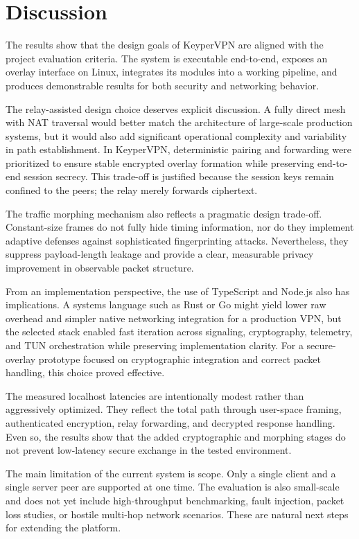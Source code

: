 \documentclass[conference]{IEEEtran}
\begin{document}
\section{Discussion}
The results show that the design goals of KeyperVPN are aligned with the project evaluation criteria. The system is executable end-to-end, exposes an overlay interface on Linux, integrates its modules into a working pipeline, and produces demonstrable results for both security and networking behavior.

The relay-assisted design choice deserves explicit discussion. A fully direct mesh with NAT traversal would better match the architecture of large-scale production systems, but it would also add significant operational complexity and variability in path establishment. In KeyperVPN, deterministic pairing and forwarding were prioritized to ensure stable encrypted overlay formation while preserving end-to-end session secrecy. This trade-off is justified because the session keys remain confined to the peers; the relay merely forwards ciphertext.

The traffic morphing mechanism also reflects a pragmatic design trade-off. Constant-size frames do not fully hide timing information, nor do they implement adaptive defenses against sophisticated fingerprinting attacks. Nevertheless, they suppress payload-length leakage and provide a clear, measurable privacy improvement in observable packet structure.

From an implementation perspective, the use of TypeScript and Node.js also has implications. A systems language such as Rust or Go might yield lower raw overhead and simpler native networking integration for a production VPN, but the selected stack enabled fast iteration across signaling, cryptography, telemetry, and TUN orchestration while preserving implementation clarity. For a secure-overlay prototype focused on cryptographic integration and correct packet handling, this choice proved effective.

The measured localhost latencies are intentionally modest rather than aggressively optimized. They reflect the total path through user-space framing, authenticated encryption, relay forwarding, and decrypted response handling. Even so, the results show that the added cryptographic and morphing stages do not prevent low-latency secure exchange in the tested environment.

The main limitation of the current system is scope. Only a single client and a single server peer are supported at one time. The evaluation is also small-scale and does not yet include high-throughput benchmarking, fault injection, packet loss studies, or hostile multi-hop network scenarios. These are natural next steps for extending the platform.
\end{document}
